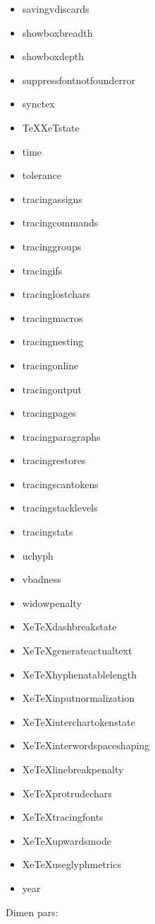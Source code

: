 \begin{itemize}
  \item savingvdiscards
  \item showboxbreadth
  \item showboxdepth
  \item suppressfontnotfounderror
  \item synctex
  \item TeXXeTstate
  \item time
  \item tolerance
  \item tracingassigns
  \item tracingcommands
  \item tracinggroups
  \item tracingifs
  \item tracinglostchars
  \item tracingmacros
  \item tracingnesting
  \item tracingonline
  \item tracingoutput
  \item tracingpages
  \item tracingparagraphs
  \item tracingrestores
  \item tracingscantokens
  \item tracingstacklevels
  \item tracingstats
  \item uchyph
  \item vbadness
  \item widowpenalty
  \item XeTeXdashbreakstate
  \item XeTeXgenerateactualtext
  \item XeTeXhyphenatablelength
  \item XeTeXinputnormalization
  \item XeTeXinterchartokenstate
  \item XeTeXinterwordspaceshaping
  \item XeTeXlinebreakpenalty
  \item XeTeXprotrudechars
  \item XeTeXtracingfonts
  \item XeTeXupwardsmode
  \item XeTeXuseglyphmetrics
  \item year
\end{itemize}

Dimen pars:

